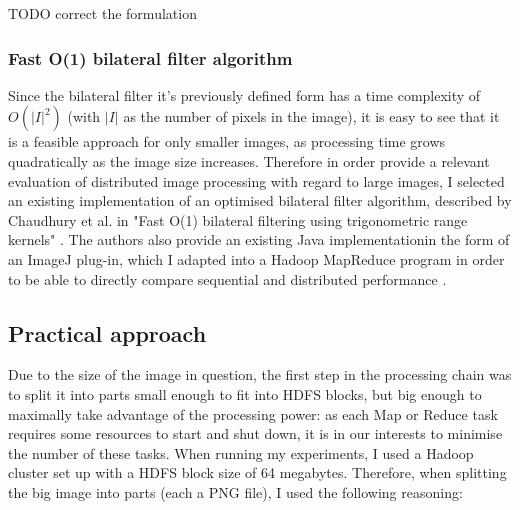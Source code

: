 \documentclass [12pt,a4paper]{report}
\begin{document}
\begin{center}
\begin{algorithm}[H]
\end{algorithm}
\end{center}

TODO correct the formulation

\subsubsection{Fast O(1) bilateral filter algorithm}

Since the bilateral filter it's previously defined form has a time complexity of $O(|I|^2)$ (with $|I|$ as the number of pixels in the image), it is easy to see that it is a feasible approach for only smaller images, as processing time grows quadratically as the image size increases. Therefore in order provide a relevant evaluation of distributed image processing with regard to large images, I selected an existing implementation of an optimised bilateral filter algorithm, described by Chaudhury et al. in "Fast O(1) bilateral filtering using trigonometric range kernels" \cite{chaudhury2011fast}. The authors also provide an existing Java implementationin the form of an ImageJ plug-in, which I adapted into a Hadoop MapReduce program in order to be able to directly compare sequential and distributed performance \cite{imagej}.

\subsection{Practical approach}

Due to the size of the image in question, the first step in the processing chain was to split it into parts small enough to fit into HDFS blocks, but big enough to maximally take advantage of the processing power: as each Map or Reduce task requires some resources to start and shut down, it is in our interests to minimise the number of these tasks. When running my experiments, I used a Hadoop cluster set up with a HDFS block size of 64 megabytes. Therefore, when splitting the big image into parts (each a PNG file), I used the following reasoning:
\end{document}
